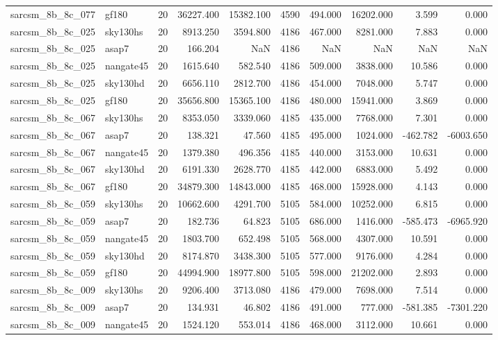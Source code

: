 \begin{tabular}{llrrrrrrrr}
sarcsm\_8b\_8c\_077 & gf180 & 20 & 36227.400 & 15382.100 & 4590 & 494.000 & 16202.000 & 3.599 & 0.000 \\
sarcsm\_8b\_8c\_025 & sky130hs & 20 & 8913.250 & 3594.800 & 4186 & 467.000 & 8281.000 & 7.883 & 0.000 \\
sarcsm\_8b\_8c\_025 & asap7 & 20 & 166.204 & NaN & 4186 & NaN & NaN & NaN & NaN \\
sarcsm\_8b\_8c\_025 & nangate45 & 20 & 1615.640 & 582.540 & 4186 & 509.000 & 3838.000 & 10.586 & 0.000 \\
sarcsm\_8b\_8c\_025 & sky130hd & 20 & 6656.110 & 2812.700 & 4186 & 454.000 & 7048.000 & 5.747 & 0.000 \\
sarcsm\_8b\_8c\_025 & gf180 & 20 & 35656.800 & 15365.100 & 4186 & 480.000 & 15941.000 & 3.869 & 0.000 \\
sarcsm\_8b\_8c\_067 & sky130hs & 20 & 8353.050 & 3339.060 & 4185 & 435.000 & 7768.000 & 7.301 & 0.000 \\
sarcsm\_8b\_8c\_067 & asap7 & 20 & 138.321 & 47.560 & 4185 & 495.000 & 1024.000 & -462.782 & -6003.650 \\
sarcsm\_8b\_8c\_067 & nangate45 & 20 & 1379.380 & 496.356 & 4185 & 440.000 & 3153.000 & 10.631 & 0.000 \\
sarcsm\_8b\_8c\_067 & sky130hd & 20 & 6191.330 & 2628.770 & 4185 & 442.000 & 6883.000 & 5.492 & 0.000 \\
sarcsm\_8b\_8c\_067 & gf180 & 20 & 34879.300 & 14843.000 & 4185 & 468.000 & 15928.000 & 4.143 & 0.000 \\
sarcsm\_8b\_8c\_059 & sky130hs & 20 & 10662.600 & 4291.700 & 5105 & 584.000 & 10252.000 & 6.815 & 0.000 \\
sarcsm\_8b\_8c\_059 & asap7 & 20 & 182.736 & 64.823 & 5105 & 686.000 & 1416.000 & -585.473 & -6965.920 \\
sarcsm\_8b\_8c\_059 & nangate45 & 20 & 1803.700 & 652.498 & 5105 & 568.000 & 4307.000 & 10.591 & 0.000 \\
sarcsm\_8b\_8c\_059 & sky130hd & 20 & 8174.870 & 3438.300 & 5105 & 577.000 & 9176.000 & 4.284 & 0.000 \\
sarcsm\_8b\_8c\_059 & gf180 & 20 & 44994.900 & 18977.800 & 5105 & 598.000 & 21202.000 & 2.893 & 0.000 \\
sarcsm\_8b\_8c\_009 & sky130hs & 20 & 9206.400 & 3713.080 & 4186 & 479.000 & 7698.000 & 7.514 & 0.000 \\
sarcsm\_8b\_8c\_009 & asap7 & 20 & 134.931 & 46.802 & 4186 & 491.000 & 777.000 & -581.385 & -7301.220 \\
sarcsm\_8b\_8c\_009 & nangate45 & 20 & 1524.120 & 553.014 & 4186 & 468.000 & 3112.000 & 10.661 & 0.000 \\

\end{tabular}
